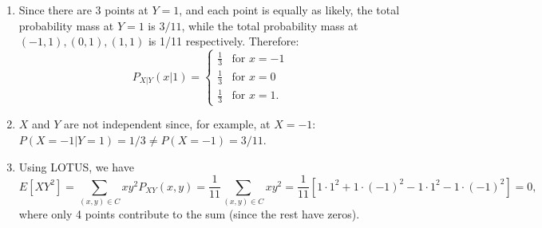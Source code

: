 \begin{problem}{9}
\begin{enumerate}
The joint PMF is:
\[
  P_{XY}(x, y) =
  \begin{cases}
                                   \frac{1}{11} & \text{for $(x, y) \in C$} \\
                                   0 & \text{otherwise} .
  \end{cases}
\]
By looking at Fig.~\ref{fig:prob_9} and adding vertically and horizontally, we can easily determine that the marginal PMFs are:
\[
  P_{X}(x) =
  \begin{cases}
                                   \frac{3}{11} & \text{for $x=-1$} \\
                                   \frac{5}{11} & \text{for $x=0$} \\
                                   \frac{3}{11} & \text{for $x=1$} 
  \end{cases}
\]
and
\[
  P_{Y}(y) =
  \begin{cases}
                                   \frac{1}{11} & \text{for $y=-2$} \\
                                   \frac{3}{11} & \text{for $y=-1$} \\
                                   \frac{3}{11} & \text{for $y=0$} \\
                                   \frac{3}{11} & \text{for $y=1$} \\
                                   \frac{1}{11} & \text{for $y=2$} .
  \end{cases}
\]

\item  Since there are 3 points at $Y=1$, and each point is equally as likely, the total probability mass at $Y=1$ is $3/11$, while the total probability mass at $(-1, 1), (0, 1), (1, 1)$ is 1/11 respectively.  Therefore:
\[
  P_{X|Y}(x|1) =
  \begin{cases}
                                   \frac{1}{3} & \text{for $x=-1$} \\
                                   \frac{1}{3} & \text{for $x=0$} \\
                                   \frac{1}{3} & \text{for $x=1$} .
  \end{cases}
\]

\item $X$ and $Y$ are not independent since, for example, at $X=-1$: $P(X=-1|Y=1) = 1/3 \neq P(X=-1) = 3/11$.

\item Using LOTUS, we have
\begin{equation*}
E[XY^2] = \sum_{(x, y) \in C} xy^2P_{XY}(x, y) = \frac{1}{11}\sum_{(x, y) \in C} xy^2 = \frac{1}{11} \left [1\cdot 1^2+1\cdot(-1)^2 -1\cdot1^2 -1\cdot(-1)^2\right]=0,
\end{equation*}
where only 4 points contribute to the sum (since the rest have zeros).

\end{enumerate}
\end{problem}


